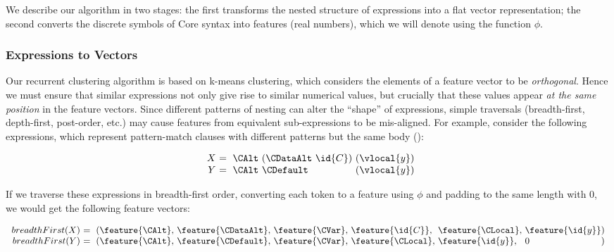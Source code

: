 We describe our algorithm in two stages: the first transforms the nested
structure of expressions into a flat vector representation; the second converts
the discrete symbols of Core syntax into features (real numbers), which we will
denote using the function $\phi$.

\subsubsection{Expressions to Vectors}
\label{sec:expressionstovectors}

Our recurrent clustering algorithm is based on k-means clustering, which
considers the elements of a feature vector to be \emph{orthogonal}. Hence we
must ensure that similar expressions not only give rise to similar numerical
values, but crucially that these values appear \emph{at the same position} in
the feature vectors. Since different patterns of nesting can alter the ``shape''
of expressions, simple traversals (breadth-first, depth-first, post-order, etc.)
may cause features from equivalent sub-expressions to be mis-aligned. For
example, consider the following expressions, which represent pattern-match
clauses with different patterns but the same body ():

\begin{equation}\label{eq:xy}
  \begin{array}{r@{}l@{}l@{}}
    X\ &=\ \CAlt\ (\CDataAlt\ \id{C})\ & (\vlocal{y}) \\
    Y\ &=\ \CAlt\ \CDefault\           & (\vlocal{y})
  \end{array}
\end{equation}

If we traverse these expressions in breadth-first order, converting each token
to a feature using $\phi$ and padding to the same length with $0$, we would get
the following feature vectors:

\begin{small}
  \begin{equation}
    \begin{array}{r@{}l@{}l@{}l@{}l@{}l@{}l@{}l}
      breadthFirst(X)\ &=\ (\feature{\CAlt},\ &\feature{\CDataAlt},\ &\feature{\CVar},\ &\feature{\id{C}},\ &\feature{\CLocal},\ &\feature{\id{y}} &) \\
      breadthFirst(Y)\ &=\ (\feature{\CAlt},\ &\feature{\CDefault},\ &\feature{\CVar},\ &\feature{\CLocal},\ &\feature{\id{y}},\ &0 &)
    \end{array}
  \end{equation}
\end{small}

